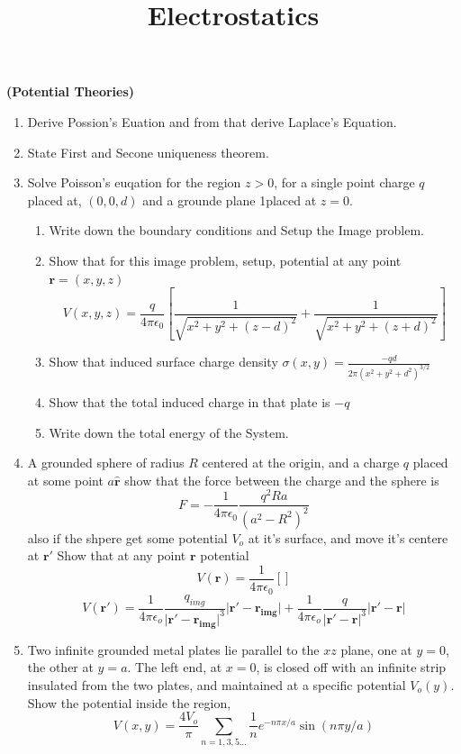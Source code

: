 \documentclass{bookq}[12pt, a4paper]
\title{Electrostatics}
\newcommand{\gfrac}[2]{\frac{\displaystyle #1}{\displaystyle #2}}
\begin{document}
\centering \textbf{(Potential Theories)}
\begin{enumerate}


\item Derive Possion's Euation and from that derive Laplace's Equation.
\item State First and Secone uniqueness theorem.
\item Solve Poisson's euqation for the region $z > 0$, for a single point charge $q$ placed at, $(0, 0, d)$ and
a grounde plane 1placed at $z = 0$.

\begin{enumerate}
	\item Write down the boundary conditions and Setup the Image problem.
	\item Show that for this image problem, setup, potential at any point \\ $\mathbf{r} = (x, y, z)$
	$$V(x, y, z) = \gfrac{q}{4\pi\epsilon_0} \left[ \gfrac{1}{\sqrt{x^2 + y^2 + (z - d)^2}} + \gfrac{1}{\sqrt{x^2 + y^2 + (z + d)^2}} \right]$$
	\item Show that induced surface charge density $\sigma(x, y) = \gfrac{-qd}{2\pi(x^2 + y^2 + d^2)^{3/2}}$
	\item Show that the total induced charge in that plate is $-q$
	\item Write down the total energy of the System.
\end{enumerate}

\item A grounded sphere of radius $R$ centered at the origin, and a charge $q$ placed at some point $a\hat{\mathbf{r}}$
show that the force between the charge and the sphere is $$F = - \gfrac{1}{4\pi\epsilon_0}\gfrac{q^2Ra}{(a^2 - R^2)^2}$$
also if the shpere get some potential $V_o$ at it's surface, and move it's centere at $\mathbf{r'}$ Show that at any point
$\mathbf{r}$ potential $$V(\mathbf{r}) = \gfrac{1}{4\pi\epsilon_0}\left[ \right]$$
$$V(\mathbf{r'}) = \gfrac{1}{4\pi\epsilon_o} \gfrac{q_{img}}{\big |\mathbf{r' - r_{img}}\big |^3}\big |\mathbf{r' - r_{img}}\big |
+ \gfrac{1}{4\pi\epsilon_o} \gfrac{q}{\big |\mathbf{r' - r}\big |^3}\big |\mathbf{r' - r}\big |
$$

\item Two inﬁnite grounded metal plates lie parallel to the $xz$ plane,
one at $y = 0$, the other at $y = a$. The left end, at $x = 0$, is closed off
with an inﬁnite strip insulated from the two plates, and maintained at a speciﬁc
potential $V_o(y)$. Show the potential inside the region,
$$
V(x, y) = \gfrac{4V_o}{\pi} \sum_{n = 1, 3, 5 \dots} \gfrac{1}{n}e^{-n\pi x/a} \sin(n\pi y/a)
$$


\end{enumerate}
\end{document}
